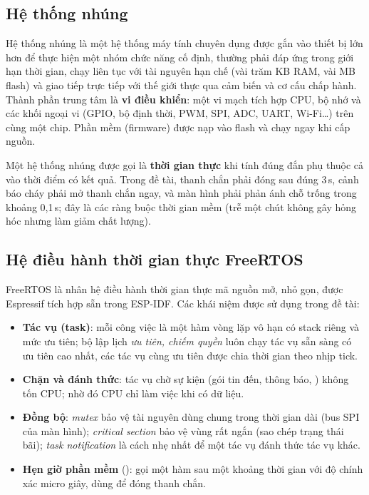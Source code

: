 \subsection{Hệ thống nhúng}
Hệ thống nhúng là một hệ thống máy tính chuyên dụng được gắn vào thiết bị lớn hơn để thực
hiện một nhóm chức năng cố định, thường phải đáp ứng trong giới hạn thời gian, chạy liên
tục với tài nguyên hạn chế (vài trăm KB RAM, vài MB flash) và giao tiếp trực tiếp với thế
giới thực qua cảm biến và cơ cấu chấp hành. Thành phần trung tâm là \textbf{vi điều khiển}:
một vi mạch tích hợp CPU, bộ nhớ và các khối ngoại vi (GPIO, bộ định thời, PWM, SPI, ADC,
UART, Wi-Fi\ldots) trên cùng một chip. Phần mềm (firmware) được nạp vào flash và chạy ngay
khi cấp nguồn.

Một hệ thống nhúng được gọi là \textbf{thời gian thực} khi tính đúng đắn phụ thuộc cả vào
thời điểm có kết quả. Trong đề tài, thanh chắn phải đóng sau đúng 3\,s, cảnh báo cháy phải
mở thanh chắn ngay, và màn hình phải phản ánh chỗ trống trong khoảng 0,1\,s; đây là các
ràng buộc thời gian mềm (trễ một chút không gây hỏng hóc nhưng làm giảm chất lượng).

\subsection{Hệ điều hành thời gian thực FreeRTOS}
FreeRTOS là nhân hệ điều hành thời gian thực mã nguồn mở, nhỏ gọn, được Espressif tích hợp
sẵn trong ESP-IDF. Các khái niệm được sử dụng trong đề tài:
\begin{itemize}
  \item \textbf{Tác vụ (task)}: mỗi công việc là một hàm vòng lặp vô hạn có stack riêng và
        mức ưu tiên; bộ lập lịch \emph{ưu tiên, chiếm quyền} luôn chạy tác vụ sẵn sàng có
        ưu tiên cao nhất, các tác vụ cùng ưu tiên được chia thời gian theo nhịp tick.
  \item \textbf{Chặn và đánh thức}: tác vụ chờ sự kiện (gói tin đến, thông báo,
        ) không tốn CPU; nhờ đó CPU chỉ làm việc khi có dữ liệu.
  \item \textbf{Đồng bộ}: \emph{mutex} bảo vệ tài nguyên dùng chung trong thời gian dài
        (bus SPI của màn hình); \emph{critical section} bảo vệ vùng rất ngắn (sao chép trạng
        thái bãi); \emph{task notification} là cách nhẹ nhất để một tác vụ đánh thức tác vụ khác.
  \item \textbf{Hẹn giờ phần mềm} (): gọi một hàm sau một khoảng thời gian
        với độ chính xác micro giây, dùng để đóng thanh chắn.
\end{itemize}
